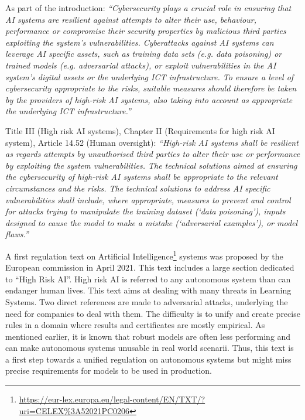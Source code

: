 \begin{tcolorbox}[colback=grund,colframe=rahmen,title=References to adversarial examples in European Commission in law proposal on Artificial Intelligence systems]
\label{ref:adversarial_law}
As part of the introduction: \textit{``Cybersecurity plays a crucial role in ensuring that AI systems are resilient against attempts to alter their use, behaviour, performance or compromise their security properties by malicious third parties exploiting the system’s vulnerabilities. Cyberattacks against AI systems can leverage AI specific assets, such as training data sets (e.g. data poisoning) or trained models (e.g. adversarial attacks), or exploit vulnerabilities in the AI system’s digital assets or the underlying ICT infrastructure. To ensure a level of cybersecurity appropriate to the risks, suitable measures should therefore be taken by the providers of high-risk AI systems, also taking into account as appropriate the underlying ICT infrastructure.''}

\medskip
Title III (High risk AI systems), Chapter II (Requirements for high risk AI system), Article 14.52 (Human oversight): \textit{``High-risk AI systems shall be resilient as regards attempts by unauthorised third parties to alter their use or performance by exploiting the system vulnerabilities.
The technical solutions aimed at ensuring the cybersecurity of high-risk AI systems shall be appropriate to the relevant circumstances and the risks.
The technical solutions to address AI specific vulnerabilities shall include, where appropriate, measures to prevent and control for attacks trying to manipulate the training dataset (‘data poisoning’), inputs designed to cause the model to make a mistake (‘adversarial examples’), or model flaws.''}
\end{tcolorbox}
\medskip
A first regulation text on Artificial Intelligence\footnote{\url{https://eur-lex.europa.eu/legal-content/EN/TXT/?uri=CELEX\%3A52021PC0206}} systems was proposed by the European commission in April 2021. This text includes a large section dedicated to ``High Risk AI''. High risk AI is referred to any autonomous system than can endanger human lives.  This text aims at dealing with many threats in Learning Systems. Two direct references are made to adversarial attacks, underlying the need for companies to deal with them. The difficulty is to unify and create precise rules in a domain where results and certificates are mostly empirical. As mentioned earlier, it is known that robust models are often less performing and can make autonomous systems unusable in real world scenarii. Thus, this text is a first step towards a unified regulation on autonomous systems but might miss precise requirements for models to be used in production.


